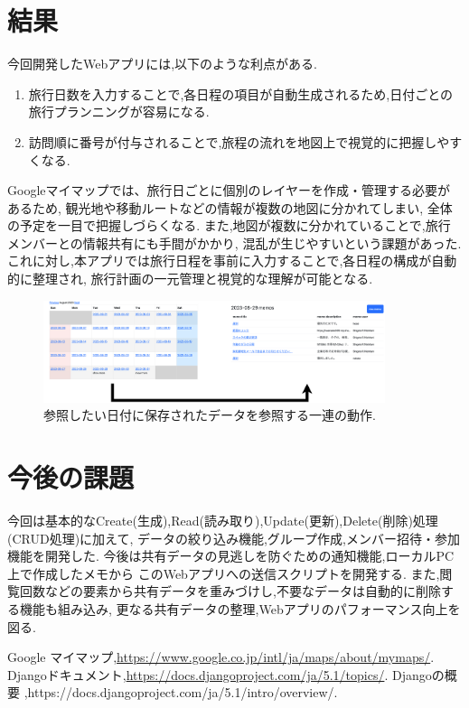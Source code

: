\documentclass[a4j,twocolumn]{jsarticle}
\begin{document}
\section{結果}
\label{sec:orgf4fd8a9}
今回開発したWebアプリには,以下のような利点がある.
\begin{enumerate}
\item 旅行日数を入力することで,各日程の項目が自動生成されるため,日付ごとの旅行プランニングが容易になる.
\item 訪問順に番号が付与されることで,旅程の流れを地図上で視覚的に把握しやすくなる.
\end{enumerate}
Googleマイマップでは、旅行日ごとに個別のレイヤーを作成・管理する必要があるため, 観光地や移動ルートなどの情報が複数の地図に分かれてしまい,
全体の予定を一目で把握しづらくなる. また,地図が複数に分かれていることで,旅行メンバーとの情報共有にも手間がかかり,
混乱が生じやすいという課題があった.
これに対し,本アプリでは旅行日程を事前に入力することで,各日程の構成が自動的に整理され,
旅行計画の一元管理と視覚的な理解が可能となる.

\begin{figure}[htbp]
\centering
\includegraphics[width=10cm]{./figs/app_motion.png}
\caption{\label{fig:orgf82e9c5}参照したい日付に保存されたデータを参照する一連の動作.}
\end{figure}


\section{今後の課題}
\label{sec:org88af1da}
今回は基本的なCreate(生成),Read(読み取り),Update(更新),Delete(削除)処理(CRUD処理)に加えて,
データの絞り込み機能,グループ作成,メンバー招待・参加機能を開発した.
今後は共有データの見逃しを防ぐための通知機能,ローカルPC上で作成したメモから
このWebアプリへの送信スクリプトを開発する.
また,閲覧回数などの要素から共有データを重みづけし,不要なデータは自動的に削除する機能も組み込み,
更なる共有データの整理,Webアプリのパフォーマンス向上を図る.


\small\setlength\baselineskip{10pt}
\begin{thebibliography}{9}

 Google マイマップ,\url{https://www.google.co.jp/intl/ja/maps/about/mymaps/}.
Djangoドキュメント,\url{https://docs.djangoproject.com/ja/5.1/topics/}.
Djangoの概要 ,https://docs.djangoproject.com/ja/5.1/intro/overview/.
\end{thebibliography}
\end{document}
